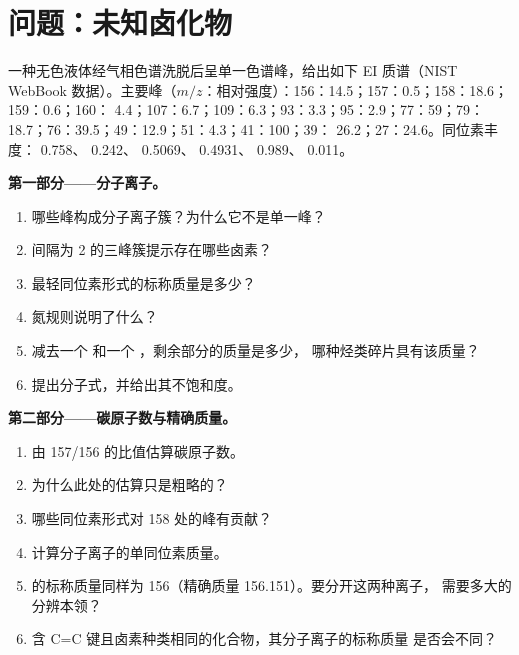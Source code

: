 \section{问题：未知卤化物}

\begin{problem}
\label{pb:b2:mass-spec-atomic:1}
一种无色液体经气相色谱洗脱后呈单一色谱峰，给出如下 EI 质谱（NIST
WebBook 数据）。主要峰（$m/z$：相对强度）：156：14.5；157：0.5；158：18.6；159：0.6；160：
4.4；107：6.7；109：6.3；93：3.3；95：2.9；77：59；79：18.7；76：39.5；49：12.9；51：4.3；41：100；39：
26.2；27：24.6。同位素丰度： 0.758、 0.242、 0.5069、
 0.4931、 0.989、 0.011。

\begin{center}
\end{center}

\medskip
\noindent\textbf{第一部分——分子离子。}
\begin{enumerate}
  \item 哪些峰构成分子离子簇？为什么它不是单一峰？
  \item 间隔为 2 的三峰簇提示存在哪些卤素？
  \item 最轻同位素形式的标称质量是多少？
  \item 氮规则说明了什么？
  \item 减去一个  和一个 ，剩余部分的质量是多少，
        哪种烃类碎片具有该质量？
  \item 提出分子式，并给出其不饱和度。
\end{enumerate}

\medskip
\noindent\textbf{第二部分——碳原子数与精确质量。}
\begin{enumerate}[resume]
  \item 由 157/156 的比值估算碳原子数。
  \item 为什么此处的估算只是粗略的？
  \item 哪些同位素形式对 158 处的峰有贡献？
  \item 计算分子离子的单同位素质量。
  \item {} 的标称质量同样为 156（精确质量 156.151）。要分开这两种离子，
        需要多大的分辨本领？
  \item 含 C=C 键且卤素种类相同的化合物，其分子离子的标称质量
        是否会不同？
\end{enumerate}


\end{problem}
